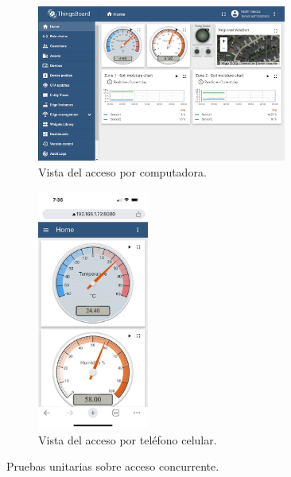 \begin{figure}[htpb]
     \centering
       \begin{subfigure}[b]{0.53\textwidth}
	    \centering
		 \includegraphics[width=0.9\textwidth]{./Figures/chapter4/tb_compu.jpg}
		\caption{Vista del acceso por computadora.}
		\label{fig:tb_compu}
     \end{subfigure}
          \hfill
     \begin{subfigure}[b]{0.45\textwidth}
		\centering
		\includegraphics[width=0.40\textwidth]{./Figures/chapter4/tb_celu.jpg}
		\caption{Vista del acceso por teléfono celular.}
		\label{fig:tb_celu}
     \end{subfigure}
     \hfill
        \caption[Pruebas unitarias de acceso concurrente]{Pruebas unitarias sobre acceso concurrente.}
        \label{fig:tb_concurrencia}
\end{figure}

